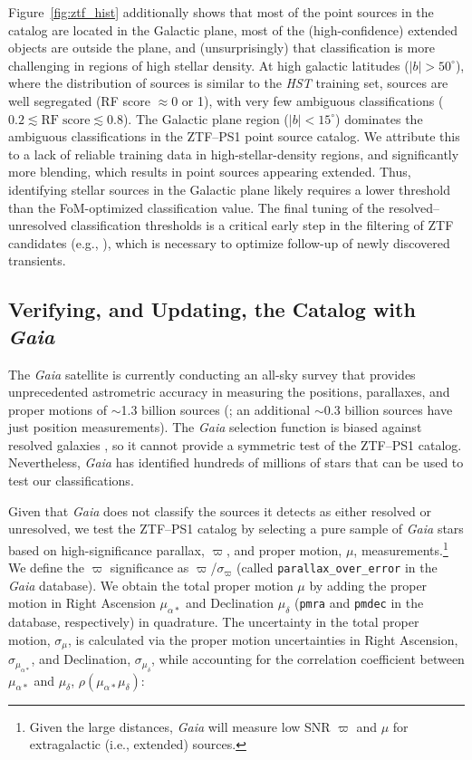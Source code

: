 \documentclass[twocolumn, dvipdfmx]{aastex62}
\begin{document}
\begin{CJK*}{UTF8}{gbsn}
Figure~\ref{fig:ztf_hist} additionally shows that most of the point sources
in the catalog are located in the Galactic plane, most of the
(high-confidence) extended objects are outside the plane, and
(unsurprisingly) that classification is more challenging in regions of high
stellar density. At high galactic latitudes ($|b| > 50^{\circ}$), where the
distribution of sources is similar to the \textit{HST} training set, sources
are well segregated (RF score $\approx$0 or 1), with very few ambiguous
classifications ($0.2 \lesssim \mathrm{RF\;score} \lesssim 0.8$). The
Galactic plane region ($|b| < 15^{\circ}$) dominates the ambiguous
classifications in the ZTF--PS1 point source catalog. We attribute this to a
lack of reliable training data in high-stellar-density regions, and
significantly more blending, which results in point sources appearing
extended. Thus, identifying stellar sources in the Galactic plane likely
requires a lower threshold than the FoM-optimized classification value. The
final tuning of the resolved--unresolved classification thresholds is a
critical early step in the filtering of ZTF candidates (e.g.,
\citealt{Kasliwal:18:ZTF}), which is necessary to optimize follow-up of
newly discovered transients.

\subsection{Verifying, and Updating, the Catalog with \textit{Gaia}}
\label{sec:gaia}

The \textit{Gaia} satellite \citep{Gaia-Collaboration16} is currently
conducting an all-sky survey that provides unprecedented astrometric
accuracy in measuring the positions, parallaxes, and proper motions of
$\sim$1.3 billion sources (\citealt{Gaia-Collaboration18}; an additional
$\sim$0.3 billion sources have just position measurements). The
\textit{Gaia} selection function is biased against resolved galaxies
\citep{Gaia-Collaboration16}, so it cannot provide a symmetric test of the
ZTF--PS1 catalog. Nevertheless, \textit{Gaia} has identified hundreds of
millions of stars that can be used to test our classifications.

Given that \textit{Gaia} does not classify the sources it detects as either
resolved or unresolved, we test the ZTF--PS1 catalog by selecting a pure
sample of \textit{Gaia} stars based on high-significance parallax, $\varpi$,
and proper motion, $\mu$, measurements.\footnote{Given the large distances,
\textit{Gaia} will measure low SNR $\varpi$ and $\mu$ for extragalactic
(i.e., extended) sources.} We define the $\varpi$ significance as
$\varpi$/$\sigma_\varpi$ (called \texttt{parallax\_over\_error} in the
\textit{Gaia} database). We obtain the total proper motion $\mu$ by adding
the proper motion in Right Ascension $\mu_{\alpha\ast}$ and Declination
$\mu_{\delta}$ (\texttt{pmra} and \texttt{pmdec} in the database,
respectively) in quadrature. The uncertainty in the total proper motion,
$\sigma_\mu$, is calculated via the proper motion uncertainties in Right
Ascension, $\sigma_{\mu_{\alpha\ast}}$, and Declination,
$\sigma_{\mu_{\delta}}$, while accounting for the correlation coefficient
between $\mu_{\alpha\ast}$ and $\mu_{\delta}$,
$\rho(\mu_{\alpha\ast}\mu_{\delta})$:


\end{CJK*}
\end{document}
